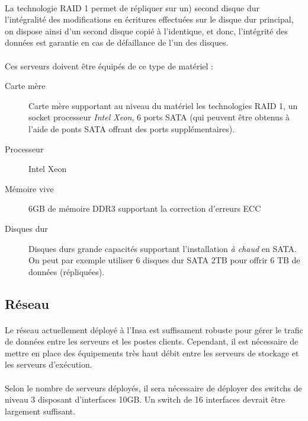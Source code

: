 \paragraph{} La technologie RAID 1 permet de répliquer sur un)
second disque dur l'intégralité des modifications en écritures effectuées
sur le disque dur principal, on dispose ainsi d'un second disque copié à
l'identique, et donc, l'intégrité des données est garantie en cas de
défaillance de l'un des disques.

\paragraph{} Ces serveurs doivent être équipés de ce type de matériel :

\begin{description}
  \item[Carte mère] Carte mère supportant au niveau du matériel
    les technologies RAID 1, un socket processeur \emph{Intel Xeon}, 6 ports SATA
    (qui peuvent être obtenus à l'aide de ponts SATA offrant des ports
    supplémentaires).
  \item[Processeur] Intel Xeon
  \item[Mémoire vive] 6GB de mémoire DDR3 supportant la correction d'erreurs ECC
  \item[Disques dur] Disques durs grande capacités supportant l'installation
    \emph{à chaud} en SATA. On peut par exemple utiliser 6 disques dur SATA 2TB
    pour offrir 6 TB de données (répliquées).
\end{description}

\subsection{Réseau}

\paragraph{} Le réseau actuellement déployé à l'Insa est suffisament robuste
pour gérer le trafic de données entre les serveurs et les postes clients.
Cependant, il est nécessaire de mettre en place des équipements très haut débit
entre les serveurs de stockage et les serveurs d'exécution.

\paragraph{} Selon le nombre de serveurs déployés, il sera nécessaire de
déployer des switchs de niveau 3 disposant d'interfaces 10GB. Un switch de 16
interfaces devrait être largement suffisant.


